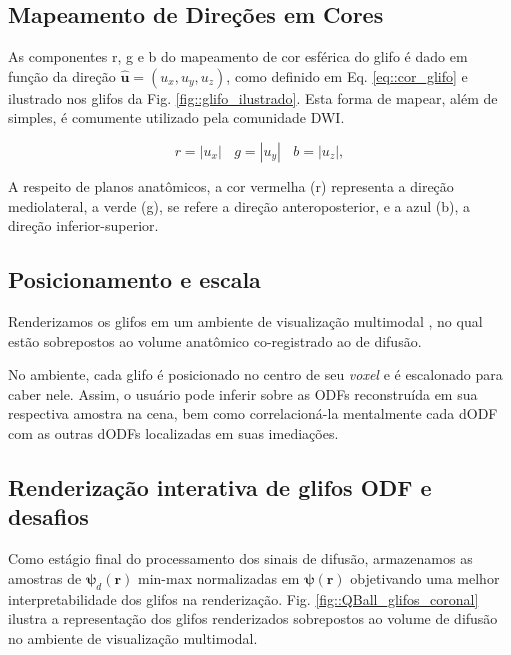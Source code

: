 \documentclass[
    12pt,                %
    oneside,            %
    a4paper,            %
    english,            %
    french,                %
    spanish,            %
    brazil                %
    ]{abntex2}
\begin{document}
\subsection{Mapeamento de Direções em Cores}

As componentes r, g e b do mapeamento de cor esférica do glifo é dado em função da direção $\mathbf{\hat{u}} = (u_x, u_y, u_z)$, como definido em Eq. \ref{eq::cor_glifo} e ilustrado nos glifos da Fig. \ref{fig::glifo_ilustrado}. Esta forma de mapear, além de simples, é comumente utilizado pela comunidade DWI. %

\begin{equation}
\label{eq::cor_glifo}
    r = |u_x| ~~~~ g = |u_y| ~~~~ b = |u_z|, 
\end{equation}


A respeito de planos anatômicos, a cor vermelha (r) representa a direção mediolateral, a verde (g), se refere a direção anteroposterior, e a azul (b), a direção inferior-superior.

\subsection{Posicionamento e escala}

Renderizamos os glifos em um ambiente de visualização multimodal \cite{VMTKNeuro}, no qual estão sobrepostos ao volume anatômico co-registrado ao de difusão.

No ambiente, cada glifo é posicionado no centro de seu \textit{voxel} e é escalonado para caber nele. Assim, o usuário pode inferir sobre as ODFs reconstruída em sua respectiva amostra na cena, bem como correlacioná-la mentalmente cada dODF com as outras dODFs localizadas em suas imediações.

\subsection{Renderização interativa de glifos ODF e desafios}

Como estágio final do processamento dos sinais de difusão, armazenamos as amostras de $\boldsymbol{\psi}_d(\mathbf{r})$ min-max normalizadas em $\boldsymbol{\psi}(\mathbf{r})$ objetivando uma melhor interpretabilidade dos glifos na renderização. Fig. \ref{fig::QBall_glifos_coronal} ilustra a representação dos glifos renderizados sobrepostos ao volume de difusão no ambiente de visualização multimodal.
\end{document}
